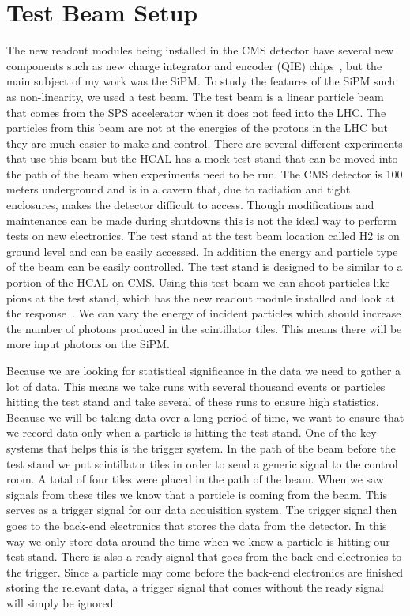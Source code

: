 \section{Test Beam Setup}


The new readout modules being installed in the CMS detector have several new components such as new charge integrator and encoder (QIE) chips~\cite{QIE, QIE2}, but the main subject of my work was the SiPM. To study the features of the SiPM such as non-linearity, we used a test beam. The test beam is a linear particle beam that comes from the SPS accelerator when it does not feed into the LHC. The particles from this beam are not at the energies of the protons in the LHC but they are much easier to make and control. There are several different experiments that use this beam but the HCAL has a mock test stand that can be moved into the path of the beam when experiments need to be run. The CMS detector is 100 meters underground and is in a cavern that, due to radiation and tight enclosures, makes the detector difficult to access. Though modifications and maintenance can be made during shutdowns this is not the ideal way to perform tests on new electronics. The test stand at the test beam location called H2 is on ground level and can be easily accessed. In addition the energy and particle type of the beam can be easily controlled. The test stand is designed to be similar to a portion of the HCAL on CMS. Using this test beam we can shoot particles like pions at the test stand, which has the new readout module installed and look at the response~\cite{TB96, TB06}. We can vary the energy of incident particles which should increase the number of photons produced in the scintillator tiles. This means there will be more input photons on the SiPM.

Because we are looking for statistical significance in the data we need to gather a lot of data. This means we take runs with several thousand events or particles hitting the test stand and take several of these runs to ensure high statistics. Because we will be taking data over a long period of time, we want to ensure that we record data only when a particle is hitting the test stand. One of the key systems that helps this is the trigger system. In the path of the beam before the test stand we put scintillator tiles in order to send a generic signal to the control room. A total of four tiles were placed in the path of the beam. When we saw signals from these tiles we know that a particle is coming from the beam. This serves as a trigger signal for our data acquisition system. The trigger signal then goes to the back-end electronics that stores the data from the detector. In this way we only store data around the time when we know a particle is hitting our test stand. There is also a ready signal that goes from the back-end electronics to the trigger. Since a particle may come before the back-end electronics are finished storing the relevant data, a trigger signal that comes without the ready signal will simply be ignored.

